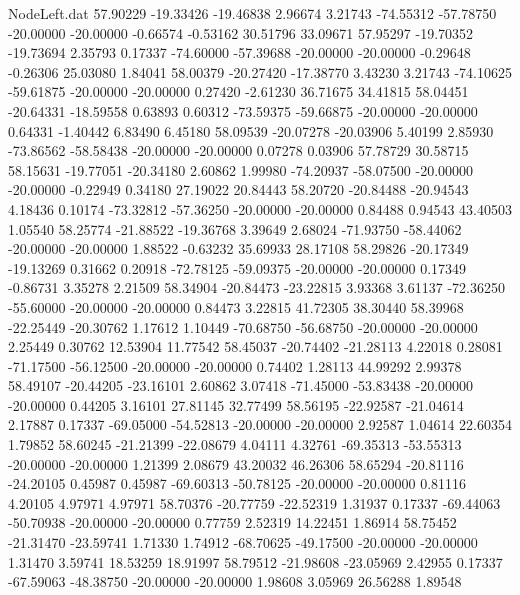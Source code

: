 \begin{filecontents}{NodeLeft.dat}
  57.90229  -19.33426  -19.46838     2.96674    3.21743  -74.55312  -57.78750  -20.00000  -20.00000   -0.66574   -0.53162   30.51796   33.09671
  57.95297  -19.70352  -19.73694     2.35793    0.17337  -74.60000  -57.39688  -20.00000  -20.00000   -0.29648   -0.26306   25.03080    1.84041
  58.00379  -20.27420  -17.38770     3.43230    3.21743  -74.10625  -59.61875  -20.00000  -20.00000    0.27420   -2.61230   36.71675   34.41815
  58.04451  -20.64331  -18.59558     0.63893    0.60312  -73.59375  -59.66875  -20.00000  -20.00000    0.64331   -1.40442    6.83490    6.45180
  58.09539  -20.07278  -20.03906     5.40199    2.85930  -73.86562  -58.58438  -20.00000  -20.00000    0.07278    0.03906   57.78729   30.58715
  58.15631  -19.77051  -20.34180     2.60862    1.99980  -74.20937  -58.07500  -20.00000  -20.00000   -0.22949    0.34180   27.19022   20.84443
  58.20720  -20.84488  -20.94543     4.18436    0.10174  -73.32812  -57.36250  -20.00000  -20.00000    0.84488    0.94543   43.40503    1.05540
  58.25774  -21.88522  -19.36768     3.39649    2.68024  -71.93750  -58.44062  -20.00000  -20.00000    1.88522   -0.63232   35.69933   28.17108
  58.29826  -20.17349  -19.13269     0.31662    0.20918  -72.78125  -59.09375  -20.00000  -20.00000    0.17349   -0.86731    3.35278    2.21509
  58.34904  -20.84473  -23.22815     3.93368    3.61137  -72.36250  -55.60000  -20.00000  -20.00000    0.84473    3.22815   41.72305   38.30440
  58.39968  -22.25449  -20.30762     1.17612    1.10449  -70.68750  -56.68750  -20.00000  -20.00000    2.25449    0.30762   12.53904   11.77542
  58.45037  -20.74402  -21.28113     4.22018    0.28081  -71.17500  -56.12500  -20.00000  -20.00000    0.74402    1.28113   44.99292    2.99378
  58.49107  -20.44205  -23.16101     2.60862    3.07418  -71.45000  -53.83438  -20.00000  -20.00000    0.44205    3.16101   27.81145   32.77499
  58.56195  -22.92587  -21.04614     2.17887    0.17337  -69.05000  -54.52813  -20.00000  -20.00000    2.92587    1.04614   22.60354    1.79852
  58.60245  -21.21399  -22.08679     4.04111    4.32761  -69.35313  -53.55313  -20.00000  -20.00000    1.21399    2.08679   43.20032   46.26306
  58.65294  -20.81116  -24.20105     0.45987    0.45987  -69.60313  -50.78125  -20.00000  -20.00000    0.81116    4.20105    4.97971    4.97971
  58.70376  -20.77759  -22.52319     1.31937    0.17337  -69.44063  -50.70938  -20.00000  -20.00000    0.77759    2.52319   14.22451    1.86914
  58.75452  -21.31470  -23.59741     1.71330    1.74912  -68.70625  -49.17500  -20.00000  -20.00000    1.31470    3.59741   18.53259   18.91997
  58.79512  -21.98608  -23.05969     2.42955    0.17337  -67.59063  -48.38750  -20.00000  -20.00000    1.98608    3.05969   26.56288    1.89548

\end{filecontents}
